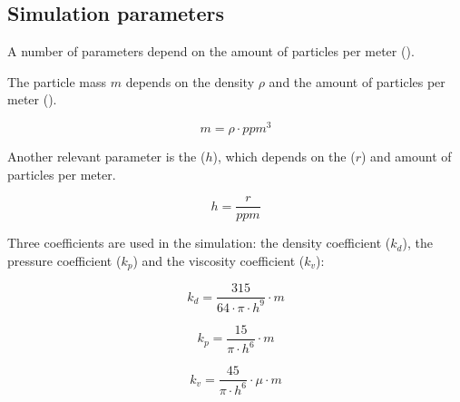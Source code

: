 \subsection{Simulation parameters}

A number of parameters depend on the amount of particles per meter
().

The particle mass $m$ depends on the density $\rho$ and the amount of particles
per meter ().

\[
m = \rho \cdot ppm^3
\]

Another relevant parameter is the  ($h$), which
depends on the  ($r$) and amount of particles per
meter.

\[
h = \frac{r}{ppm}
\]

Three coefficients are used in the simulation: the density coefficient ($k_d$), the
pressure coefficient ($k_p$) and the viscosity coefficient ($k_v$):

\[
k_d = \frac{315}{64 \cdot \pi \cdot h^9} \cdot m
\]

\[
k_p = \frac{15}{\pi \cdot h^6} \cdot m
\]

\[
k_v = \frac{45}{\pi \cdot h^6} \cdot \mu \cdot m
\]

